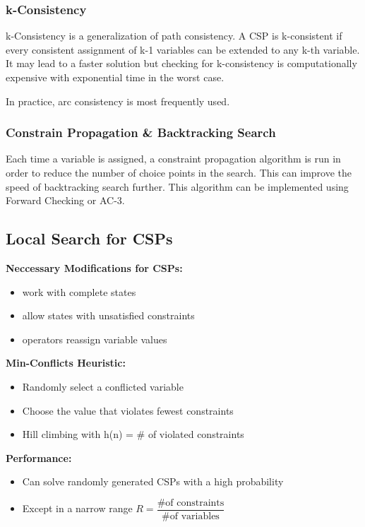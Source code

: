 \documentclass[
../EiKI_Summary.tex,
]
{subfiles}
\begin{document}
\subsubsection{k-Consistency}
k-Consistency is a generalization of path consistency. A CSP is k-consistent if every consistent assignment of k-1 variables can be extended to any k-th variable. It may lead to a faster solution but checking for k-consistency is computationally expensive with exponential time in the worst case. 

In practice, arc consistency is most frequently used.

\subsubsection{Constrain Propagation \& Backtracking Search}
Each time a variable is assigned, a constraint propagation algorithm is run in order to reduce the number of choice points in the search. This can improve the speed of backtracking search further. This algorithm can be implemented using Forward Checking or AC-3.

\newpage
\subsection{Local Search for CSPs}
\begin{minipage}
    [t]{0.5\textwidth}
    \textbf{Neccessary Modifications for CSPs:}
    \begin{itemize}
        \item work with complete states
        \item allow states with unsatisfied constraints
        \item operators reassign variable values
    \end{itemize}
\end{minipage}
\begin{minipage}
    [t]{0.5\textwidth}
    \textbf{Min-Conflicts Heuristic:}
    \begin{itemize}
        \item Randomly select a conflicted variable
        \item Choose the value that violates fewest constraints
        \item Hill climbing with h(n) = \# of violated constraints
    \end{itemize}
\end{minipage}

\textbf{Performance:}
\begin{itemize}
    \item Can solve randomly generated CSPs with a high probability
    \item Except in a narrow range $R = \dfrac{\text{\# of constraints}}{\text{\# of variables}}$
\end{itemize}
\end{document}

